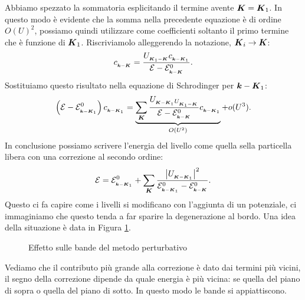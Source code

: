 Abbiamo spezzato la sommatoria esplicitando il termine avente $\boldsymbol{K} = \boldsymbol{K}_1$. In questo modo è evidente che la somma nella precedente equazione è di ordine $O(U)^2$, possiamo quindi utilizzare come coefficienti soltanto il primo termine che è funzione di $\boldsymbol{K}_1$. Riscriviamolo alleggerendo la notazione, $\boldsymbol{K}_i \to \boldsymbol{K}$:
\[
	c_{_{\boldsymbol{k}-\boldsymbol{K}}} = 
	\frac{U_{_{\boldsymbol{K}_1-\boldsymbol{K}}}c_{_{\boldsymbol{k}-\boldsymbol{K}_1}}}
	{\mathcal{E}-\mathcal{E}^0_{_{\boldsymbol{k}-\boldsymbol{K}}}}
.\] 
Sostituiamo questo risultato nella equazione di Schrodinger per $\boldsymbol{k}-\boldsymbol{K}_1$:
\[
	\left( \mathcal{E}-\mathcal{E}^0_{_{\boldsymbol{k}-\boldsymbol{K}_1}} \right) 
	c_{_{\boldsymbol{k}-\boldsymbol{K}_1}} 
	=
	\underbrace{
	\sum_{\boldsymbol{K}}^{} \frac{U_{_{\boldsymbol{K}-\boldsymbol{K}_1}U_{_{\boldsymbol{K}_1-\boldsymbol{K}}}}}
	{\mathcal{E}-\mathcal{E}^0_{_{\boldsymbol{k}-\boldsymbol{K}}}}
	c_{_{\boldsymbol{k}-\boldsymbol{K}_1}}
	}_{O(U^2)}
	 + o(U^3)
.\] 
In conclusione possiamo scrivere l'energia del livello come quella sella particella libera con una correzione al secondo ordine:
\[
	\mathcal{E} 
	=
	\mathcal{E}^0_{_{\boldsymbol{k}-\boldsymbol{K}_1}} 
	+
	\sum_{\boldsymbol{K}}^{} \frac{\left| U_{_{\boldsymbol{K}-\boldsymbol{K}_1}} \right|^2}
	{\mathcal{E}^0_{_{\boldsymbol{k}-\boldsymbol{K}_1}}-\mathcal{E}^0_{_{\boldsymbol{k}-\boldsymbol{K}}}}
.\] 
Questo ci fa capire come i livelli si modificano con l'aggiunta di un potenziale, ci immaginiamo che questo tenda a far sparire la degenerazione al bordo. Una idea della situazione è data in Figura \ref{fig:effetto-sulle-bande-del-metodo-perturbativo}. 
\begin{figure}[ht]
    \centering
    \caption{Effetto sulle bande del metodo perturbativo}
    \label{fig:effetto-sulle-bande-del-metodo-perturbativo}
\end{figure}
Vediamo che il contributo più grande alla correzione è dato dai termini più vicini, il segno della correzione dipende da quale energia è più vicina: se quella del piano di sopra o quella del piano di sotto. In questo modo le bande si appiattiscono.
